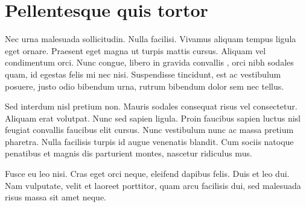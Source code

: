 \documentclass[a4paper,french]{style-LaTeX} %
\begin{document}
\section{Pellentesque quis tortor}

Nec urna malesuada sollicitudin. Nulla facilisi. Vivamus aliquam
tempus ligula eget ornare. Praesent eget magna ut turpis mattis
cursus. Aliquam vel condimentum orci. Nunc congue, libero in gravida
convallis \cite{DBLP:conf/focs/HopcroftPV75}, orci nibh sodales quam,
id egestas felis mi nec nisi. Suspendisse tincidunt, est ac vestibulum
posuere, justo odio bibendum urna, rutrum bibendum dolor sem nec
tellus.

\begin{lemma} Sed interdum nisl pretium
non. Mauris sodales consequat risus vel consectetur. Aliquam erat
volutpat. Nunc sed sapien ligula. Proin faucibus sapien luctus nisl
feugiat convallis faucibus elit cursus. Nunc vestibulum nunc ac massa
pretium pharetra. Nulla facilisis turpis id augue venenatis blandit.
Cum sociis natoque penatibus et magnis dis parturient montes, nascetur
ridiculus mus. 
\end{lemma}

Fusce eu leo nisi. Cras eget orci neque, eleifend dapibus felis. Duis
et leo dui. Nam vulputate, velit et laoreet porttitor, quam arcu
facilisis dui, sed malesuada risus massa sit amet neque.









\end{document}
